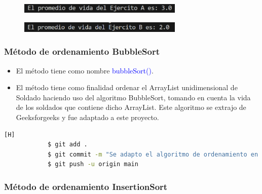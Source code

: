 \documentclass{article}
\begin{document}
        \begin{figure}[H]
            \centering
            \includegraphics[width=0.7\textwidth,keepaspectratio]{img/averageHealth.png}
            \caption{}
        \end{figure}

        \begin{figure}[H]
            \centering
            \includegraphics[width=0.7\textwidth,keepaspectratio]{img/averageHealth2.png}
            \caption{}
        \end{figure}
        
        \newpage
        \subsubsection{Método de ordenamiento BubbleSort}

        \begin{itemize}
            \item El método tiene como nombre \textcolor{blue}{bubbleSort()}.
            \item El método tiene como finalidad ordenar el ArrayList unidimensional de Soldado haciendo uso del algoritmo BubbleSort, tomando en cuenta la vida de los soldados que contiene dicho ArrayList. Este algoritmo se extrajo de Geeksforgeeks y fue adaptado a este proyecto.
        \end{itemize}

        

        \begin{lstlisting}[language=bash,caption={Commit: Se implementó el método bubbleSort() para ordenar los soldados de mayor a menor vida}][H]
    		$ git add .
    		$ git commit -m "Se adapto el algoritmo de ordenamiento en el metodo bubbleSort para trabajar ahora con los ArrayList de soldados"			
    		$ git push -u origin main
    	\end{lstlisting}
        
        \newpage
        \subsubsection{Método de ordenamiento InsertionSort}
        
\end{document}
